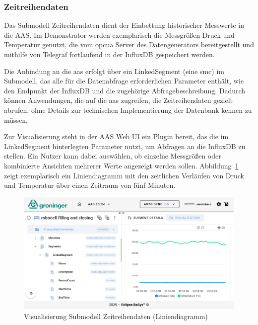 \newpage
\subsubsection*{Zeitreihendaten}
\vspace{-0.5em}

Das Submodell Zeitreihendaten dient der Einbettung historischer Messwerte in die AAS.
Im Demonstrator werden exemplarisch die Messgrößen Druck und Temperatur genutzt, die vom \acs{opcua} Server des Datengenerators bereitgestellt und mithilfe von Telegraf fortlaufend in der InfluxDB gespeichert werden.

Die Anbindung an die \acs{aas} erfolgt über ein LinkedSegment (eine \acs{smc}) im Submodell, das alle für die Datenabfrage erforderlichen Parameter enthält, wie den Endpunkt der InfluxDB und die zugehörige Abfragebeschreibung. 
Dadurch können Anwendungen, die auf die \acs{aas} zugreifen, die Zeitreihendaten gezielt abrufen, ohne Details zur technischen Implementierung der Datenbank kennen zu müssen.

Zur Visualisierung steht in der AAS Web UI ein Plugin bereit, das die im LinkedSegment hinterlegten Parameter nutzt, um Abfragen an die InfluxDB zu stellen.
Ein Nutzer kann dabei auswählen, ob einzelne Messgrößen oder kombinierte Ansichten mehrerer Werte angezeigt werden sollen. 
Abbildung~\ref{fig:LiniendiagrammBaSyx} zeigt exemplarisch ein Liniendiagramm mit den zeitlichen Verläufen von Druck und Temperatur über einen Zeitraum von fünf Minuten.

\begin{figure}[htbp]
    \centering
        \includegraphics[width=1\textwidth]{Bilder/ErgebnisseAASWebUI/Zeitreihen.png}
    \caption[Visualisierung Submodell Zeitreihendaten]{Visualisierung Submodell Zeitreihendaten (Liniendiagramm)}
    \label{fig:LiniendiagrammBaSyx}
\end{figure}
\vspace{-0.5em}

